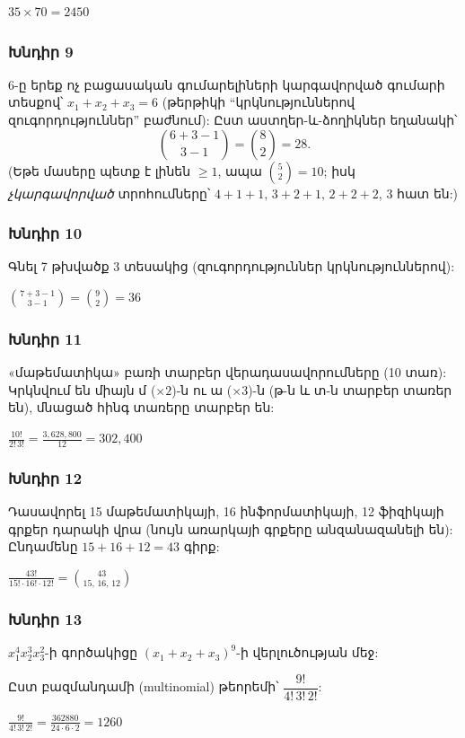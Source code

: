 $\boxed{35\times 70 = 2450}$

\subsubsection*{Խնդիր 9}
6-ը երեք ոչ բացասական գումարելիների կարգավորված գումարի տեսքով՝ $x_1+x_2+x_3=6$ (թերթիկի ``կրկնություններով զուգորդություններ'' բաժնում): Ըստ աստղեր-և-ձողիկներ եղանակի՝
\[ \binom{6+3-1}{3-1} = \binom{8}{2} = \boxed{28}. \]
(Եթե մասերը պետք է լինեն $\ge 1$, ապա $\binom{5}{2}=10$; իսկ \emph{չկարգավորված} տրոհումները՝ $4{+}1{+}1,\,3{+}2{+}1,\,2{+}2{+}2$, $3$ հատ են:)

\subsubsection*{Խնդիր 10}
Գնել 7 թխվածք 3 տեսակից (զուգորդություններ կրկնություններով):

$\boxed{\binom{7+3-1}{3-1} = \binom{9}{2} = 36}$

\subsubsection*{Խնդիր 11}
«մաթեմատիկա» բառի տարբեր վերադասավորումները (10 տառ): Կրկնվում են միայն մ ($\times 2$)-ն ու ա ($\times 3$)-ն (թ-ն և տ-ն տարբեր տառեր են), մնացած հինգ տառերը տարբեր են:

$\boxed{\frac{10!}{2!\,3!} = \frac{3{,}628{,}800}{12} = 302{,}400}$

\subsubsection*{Խնդիր 12}
Դասավորել 15 մաթեմատիկայի, 16 ինֆորմատիկայի, 12 ֆիզիկայի գրքեր դարակի վրա (նույն առարկայի գրքերը անզանազանելի են): Ընդամենը $15+16+12=43$ գիրք:

$\boxed{\frac{43!}{15!\cdot 16!\cdot 12!} = \binom{43}{15,\,16,\,12}}$

\subsubsection*{Խնդիր 13}
$x_1^4 x_2^3 x_3^2$-ի գործակիցը $(x_1+x_2+x_3)^9$-ի վերլուծության մեջ:

Ըստ բազմանդամի (multinomial) թեորեմի՝ $\dfrac{9!}{4!\,3!\,2!}$:

$\boxed{\frac{9!}{4!\,3!\,2!} = \frac{362880}{24\cdot 6\cdot 2} = 1260}$